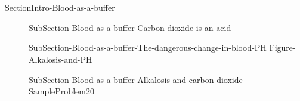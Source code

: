 \documentclass[main.tex]{subfiles}
\begin{document}
\section{\color{blue!30!black}{Blood as a buffer}}{SectionIntro-Blood-as-a-buffer}
\sloppy\begin{description}
\item[] {SubSection-Blood-as-a-buffer-Carbon-dioxide-is-an-acid}
\item[] {SubSection-Blood-as-a-buffer-The-dangerous-change-in-blood-PH}
{Figure-Alkalosis-and-PH}
\item[] {SubSection-Blood-as-a-buffer-Alkalosis-and-carbon-dioxide}
{SampleProblem20}
\end{description}
 
\end{document}
